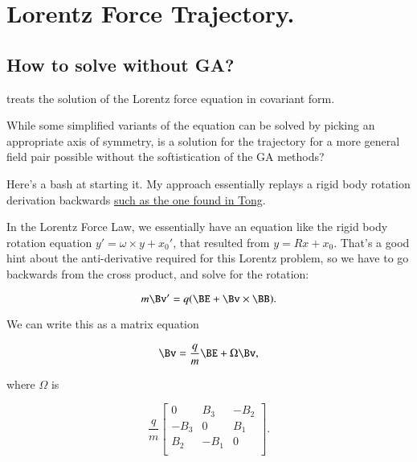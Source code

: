 \chapter{Lorentz Force Trajectory.}
\label{chap:lorentzRotation}
\date{May 7, 2008.  lorentzRotation.tex}

\section{How to solve without GA? }

\cite{doran2003gap} treats the solution of the Lorentz force equation in covariant form.

While some simplified variants of the equation can be solved by picking an appropriate axis of symmetry, is a solution for the trajectory for a more general field pair possible without the softistication of the GA methods?

Here's a bash at starting it.  My approach essentially replays a rigid body rotation derivation backwards \href{http://www.damtp.cam.ac.uk/user/tong/dynamics/three.pdf}{such as the one found in Tong}.

In the Lorentz Force Law, we essentially have an equation like the rigid body rotation equation $y' = \omega \times y + x_0'$, that resulted from $y = R x + x_0$.  That's a good hint about the anti-derivative required for this Lorentz problem, so we have to go backwards from the cross product, and solve for the rotation:
 
\begin{equation}\label{eqn:lorentzRotation:n}
m \Bv' = q ( \BE + \Bv \times \BB ).
\end{equation}

We can write this as a matrix equation

\begin{equation}\label{eqn:lorentzRotation:n}
\Bv = \frac{q}{m} \BE + \Omega \Bv,
\end{equation}

where $\Omega$ is

\begin{equation}\label{eqn:lorentzRotation:n}
\frac{q}{m}
\begin{bmatrix}
0 & B_3 & -B_2 \\
-B_3 & 0 & B_1 \\
B_2 & -B_1 & 0 \\
\end{bmatrix}.
\end{equation}


